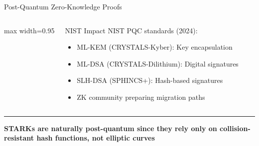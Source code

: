 \documentclass[8pt,aspectratio=169]{beamer}
\newcommand{\bottomnote}[1]{\vfill\vspace{-2mm}\textcolor{mllavender2}{\rule{\textwidth}{0.4pt}}\vspace{1mm}\footnotesize\textbf{#1}}
\begin{document}
\begin{frame}{Post-Quantum Zero-Knowledge Proofs}
\begin{columns}[T]
\begin{center}
\begin{adjustbox}{max width=0.95\columnwidth}
\begin{tabular}{l c c}
\bottomrule
\end{tabular}
\end{adjustbox}
\end{center}
\vspace{0.2cm}
\begin{alertblock}{\footnotesize NIST Impact}
\footnotesize
NIST PQC standards (2024):
\begin{itemize}
\item ML-KEM (CRYSTALS-Kyber): Key encapsulation
\item ML-DSA (CRYSTALS-Dilithium): Digital signatures
\item SLH-DSA (SPHINCS+): Hash-based signatures
\item ZK community preparing migration paths
\end{itemize}
\end{alertblock}
\end{columns}
\bottomnote{STARKs are naturally post-quantum since they rely only on collision-resistant hash functions, not elliptic curves}
\end{frame}
\end{document}
